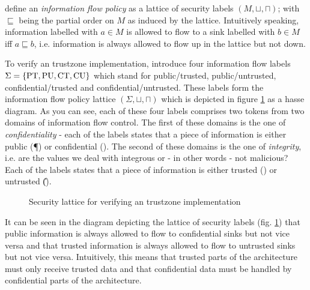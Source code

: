 \citeauthor{Ferraiuolo17} define an \textit{information flow policy} as a lattice of security labels $ (M, \sqcup, \sqcap) $; with $ \sqsubseteq $ being the partial order on $ M $ as induced by the lattice.
Intuitively speaking, information labelled with $ a \in M $ is allowed to flow to a sink labelled with $ b \in M $ iff $ a \sqsubseteq b $, i.e. information is always allowed to flow up in the lattice but not down.

\begin{example}
    To verify an \gls{trustzone} implementation, \citeauthor{Ferraiuolo17} introduce four information flow labels $ \Sigma = \{ \text{PT}, \text{PU}, \text{CT}, \text{CU} \} $ which stand for public/trusted, public/untrusted, confidential/trusted and confidential/untrusted.
    These labels form the information flow policy lattice $ (\Sigma, \sqcup, \sqcap) $ which is depicted in figure \ref{fig:sec-lattice} as a hasse diagram.
    As you can see, each of these four labels comprises two tokens from two domains of information flow control.
    The first of these domains is the one of \textit{confidentiality} - each of the labels states that a piece of information is either public (\P{}) or confidential (\C{}).
    The second of these domains is the one of \textit{integrity}, i.e. are the values we deal with integrous or - in other words - not malicious?
    Each of the labels states that a piece of information is either trusted (\T{}) or untrusted (\U{}).

    \begin{figure}
        \centering
        \caption{Security lattice for verifying an \gls{trustzone} implementation \cite{Ferraiuolo17}}
        \label{fig:sec-lattice}
    \end{figure}

    It can be seen in the diagram depicting the lattice of security labels (fig. \ref{fig:sec-lattice}) that public information is always allowed to flow to confidential sinks but not vice versa and that trusted information is always allowed to flow to untrusted sinks but not vice versa.
    Intuitively, this means that trusted parts of the architecture must only receive trusted data and that confidential data must be handled by confidential parts of the architecture.
\end{example}

